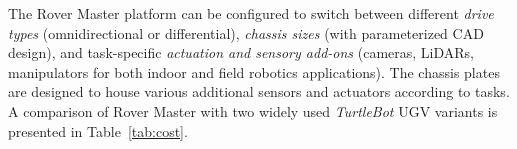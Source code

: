 
The Rover Master platform can be configured to switch between different \textit{drive types} (omnidirectional or differential), \textit{chassis sizes} (with parameterized CAD design), and task-specific \textit{actuation and sensory add-ons} (cameras, LiDARs, manipulators for both indoor and field robotics applications). The chassis plates are designed to house various additional sensors and actuators according to tasks.
A comparison of Rover Master with two widely used \textit{TurtleBot} UGV variants is presented in Table~\ref{tab:cost}.




